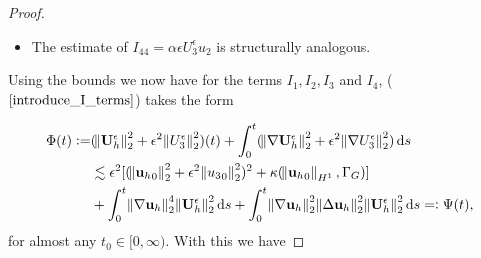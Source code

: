 \documentclass[11pt]{article}
\newcommand*\diff{\mathop{}\!\mathrm{d}}
\begin{document}
\begin{proof}
\begin{itemize}
$$ \hspace{-1em}\int_{Q_{t_0}} \epsilon \beta U_3^\epsilon u_1 \diff x \diff y \diff z \diff t \lesssim \int_0^{t_0} \epsilon \norm{U_3^\epsilon}_2 \norm{u_1}_2 \diff t \lesssim \int_0^{t_0} \epsilon \| \nabla \mathbf{U}_h^\epsilon \|_2 \norm{u_1}_2 \diff t, $$
%
and finally, after applying the Young inequality we arrive to
%
\begin{equation}
\begin{split}
I_{43} = & \int_{Q_{t_0}} \epsilon \beta U_3^\epsilon u_1 \diff x \diff y \diff z \diff t \lesssim \zeta \int_0^{t_0} \norm{\nabla \mathbf{U}_h^\epsilon}_2^2 \diff s + \frac{1}{\zeta} \epsilon^2 \int_0^{t_0} \norm{u_1}_2^2 \diff s \\
& \lesssim \zeta \int_0^{t_0} \norm{\nabla \mathbf{U}_h^\epsilon}_2^2 \diff t + \frac{1}{\zeta} \epsilon^2 \kappa (\norm{{\mathbf{u}_h}_0}_{H^1}, \Gamma_G),
\end{split}
\end{equation}
%
where the first term can be merged into the left-hand side of ($\ref{introduce_I_terms}$).

\item The estimate of $ I_{44} = \alpha \epsilon U_3^\epsilon u_2$ is structurally analogous.

\end{itemize}

Using the bounds we now have for the terms $I_1, I_2, I_3$ and $I_4$, ($\ref{introduce_I_terms}$) takes the form

\begin{equation}
\begin{split} \nonumber
\Phi (t):= & (\norm{\mathbf{U}_h^\epsilon}_2^2 + \epsilon^2 \norm{U_3^\epsilon}_2^2)(t) + \int_0^t (\norm{\nabla \mathbf{U}_h^\epsilon}_2^2 + \epsilon^2 \norm{\nabla U_3^\epsilon}_2^2) \diff s \\
& \lesssim \epsilon^2 [(\norm{{\mathbf{u}_h}_0}_2^2 + \epsilon^2 \norm{{u_3}_0}_2^2)^2 + \kappa (\norm{{\mathbf{u}_h}_0}_{H^1}, \Gamma_G)] \\
& + \int_0^{t} \norm{\nabla \mathbf{u}_h}_2^4 \norm{\mathbf{U}_h^\epsilon}_2^2 \diff s + \int_0^{t} \norm{\nabla \mathbf{u}_h}_2^2 \norm{\Delta \mathbf{u}_h}_2^2 \norm{\mathbf{U}_h^\epsilon}_2^2 \diff s =: \Psi(t),
\end{split}
\end{equation}
%
for almost any $t_0 \in [0, \infty).$ With this we have


\end{proof}
\end{document}
